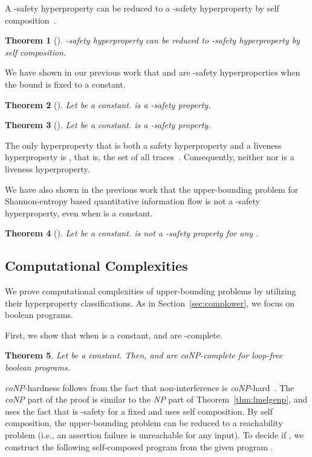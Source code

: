 \documentclass[]{eptcs}
\newtheorem{theorem}{Theorem}[section]
\begin{document}
A -safety hyperproperty can be reduced to a -safety
hyperproperty by self composition~\cite{barthe:csfw04,darvas:spc05}.
\begin{theorem}[\cite{DBLP:journals/jcs/ClarksonS10}]
  -safety hyperproperty can be reduced to -safety hyperproperty
  by self composition.
\end{theorem}

We have shown in our previous work that  and
 are -safety hyperproperties when the bound
 is fixed to a constant.
\begin{theorem}[\cite{DBLP:conf/esorics/YasuokaT10}]
\label{thm:umes}
Let  be a constant.   is a -safety property.
\end{theorem}
\begin{theorem}[\cite{DBLP:conf/esorics/YasuokaT10}]
\label{thm:uges}
Let  be a constant.   is a -safety property.
\end{theorem}

The only hyperproperty that is both a safety hyperproperty and a
liveness hyperproperty is , that is, the
set of all traces~\cite{DBLP:journals/jcs/ClarksonS10}.  Consequently,
neither  nor  is a
liveness hyperproperty.

We have also shown in the previous work that the upper-bounding
problem for Shannon-entropy based quantitative information flow is not
a -safety hyperproperty, even when  is a constant.
\begin{theorem}[\cite{DBLP:conf/esorics/YasuokaT10}]
  Let  be a constant.   is not a -safety
  property for any .
\end{theorem}

\subsection{Computational Complexities}
We prove computational complexities of upper-bounding problems by
utilizing their hyperproperty classifications.  As in
Section~\ref{sec:complower}, we focus on boolean programs.

First, we show that when  is a constant,  and
 are -complete.
\begin{theorem}
\label{thm:umeugeconp}
  Let  be a constant.  Then,  and
   are {\it coNP}-complete for loop-free boolean
  programs.
\end{theorem}
{\it coNP}-hardness follows from the fact that non-interference is
{\it coNP}-hard~\cite{DBLP:conf/esorics/YasuokaT10}.  The {\it coNP}
part of the proof is similar to the {\it NP} part of
Theorem~\ref{thm:lmelgenp}, and uses the fact that  is -safety for a fixed  and uses self composition.  By
self composition, the upper-bounding problem can be reduced to a
reachability problem (i.e., an assertion failure is unreachable for
any input).  To decide if , we construct the
following self-composed program  from the given program .
\end{document}
